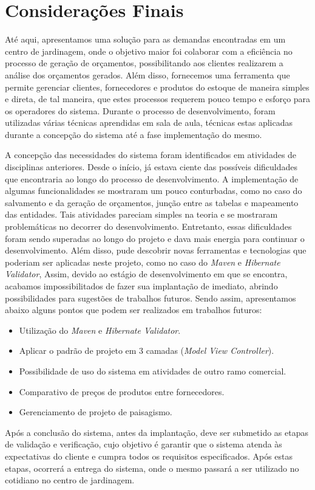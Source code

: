 \chapter{Considerações Finais}

Até aqui, apresentamos uma solução para as demandas encontradas em um centro de jardinagem, onde o objetivo maior foi colaborar com a eficiência no processo de geração de orçamentos, possibilitando aos clientes realizarem a análise dos orçamentos gerados. Além disso, fornecemos uma ferramenta que permite gerenciar clientes, fornecedores e produtos do estoque de maneira simples e direta, de tal maneira, que estes processos requerem pouco tempo e esforço para os operadores do sistema. 
Durante o processo de desenvolvimento, foram utilizadas várias técnicas aprendidas em sala de aula, técnicas estas aplicadas durante a concepção do sistema até a fase implementação do mesmo.

A concepção das necessidades do sistema foram identificados em atividades de disciplinas anteriores. Desde o início, já estava ciente das possíveis dificuldades que encontraria ao longo do processo de desenvolvimento. A implementação de algumas funcionalidades se mostraram um pouco conturbadas, como no caso do salvamento e da geração de orçamentos, junção entre as tabelas e mapeamento das entidades. Tais atividades pareciam simples na teoria e se mostraram problemáticas no decorrer do desenvolvimento. Entretanto, essas dificuldades foram sendo superadas ao longo do projeto e dava mais energia para continuar o desenvolvimento. Além disso, pude descobrir novas ferramentas e tecnologias que poderiam ser aplicadas neste projeto, como no caso do \textit{Maven} e \textit{Hibernate Validator}, Assim, devido ao estágio de desenvolvimento em que se encontra, acabamos impossibilitados de fazer sua implantação de imediato, abrindo possibilidades para sugestões de trabalhos futuros. Sendo assim, apresentamos abaixo alguns pontos que podem ser realizados em trabalhos futuros:

\begin{itemize}
    \item Utilização do \textit{Maven} e \textit{Hibernate Validator}.
    \item Aplicar o padrão de projeto em 3 camadas (\textit{Model View Controller}).
    \item Possibilidade de uso do sistema em atividades de outro ramo comercial.
    \item Comparativo de preços de produtos entre fornecedores.
    \item Gerenciamento de projeto de paisagismo.
\end{itemize}

Após a conclusão do sistema, antes da implantação, deve ser submetido as etapas de validação e verificação, cujo objetivo é garantir que o sistema atenda às expectativas do cliente e cumpra todos os requisitos especificados. Após estas etapas, ocorrerá a entrega do sistema, onde o mesmo passará a ser utilizado no cotidiano no centro de jardinagem.
